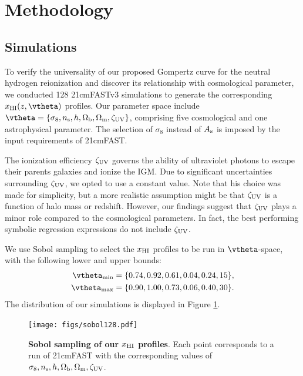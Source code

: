 \section*{Methodology}
\label{sec:methods}




\subsection*{Simulations}
\label{ssec:sims}

To verify the universality of our proposed Gompertz curve for the
neutral hydrogen reionization and discover its relationship with
cosmological parameter, we conducted 128 {\sc 21cmFASTv3} simulations to
generate the corresponding $x_\HI(z, \vtheta)$ profiles.
Our parameter space include $\vtheta = \{\sigma_8, \ns, h, \Omegab,
\Omegam, \zetaUV\}$, comprising five cosmological and one astrophysical
parameter.
The selection of $\sigma_8$ instead of $A_\mathrm{s}$ is imposed by the input
requirements of 21cmFAST.

The ionization efficiency $\zeta_\mathrm{UV}$ governs the ability of ultraviolet
photons to escape their parents galaxies and ionize the IGM.
Due to significant uncertainties surrounding $\zeta_\mathrm{UV}$, we opted to use
a constant value.
Note that his choice was made for simplicity, but a more realistic
assumption might be that $\zeta_\mathrm{UV}$ is a function of halo mass
\cite{Park2019} or redshift.
However, our findings suggest that $\zeta_\mathrm{UV}$ plays a  minor role
compared to the cosmological parameters.
In fact, the best performing symbolic regression expressions do not
include $\zeta_\mathrm{UV}$.

We use Sobol sampling to select the $x_{\mathrm{HI}}$ profiles to be run in
$\vtheta$-space, with the following lower and upper bounds:
%
\begin{align}
\vtheta_\mathrm{min} &= \{ 0.74, 0.92, 0.61, 0.04, 0.24, 15\}, \\
\vtheta_\mathrm{max} &= \{0.90, 1.00, 0.73, 0.06, 0.40, 30\}.
\end{align}
%
The distribution of our simulations is displayed in Figure
\ref{fig:sobol}.

\begin{figure}
\centering
\texttt{[image: figs/sobol128.pdf]}
\caption{\textbf{Sobol sampling of our $x_{\mathrm{HI}}$ profiles}.
Each point corresponds to a run of 21cmFAST with the corresponding
values of $\sigma_8, n_\mathrm{s}, h, \Omega_\mathrm{b}, \Omega_\mathrm{m}, \zeta_\mathrm{UV}$.}
\label{fig:sobol}
\end{figure}

